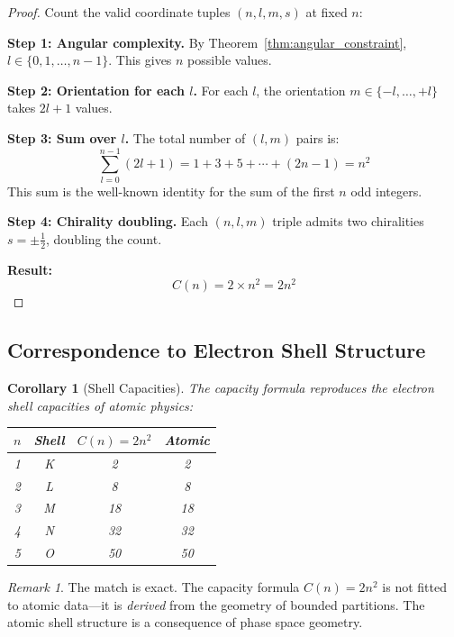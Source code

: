\documentclass[twocolumn,10pt,a4paper]{article}
\newtheorem{corollary}[theorem]{Corollary}
\theoremstyle{definition}
\theoremstyle{remark}
\newtheorem{remark}[theorem]{Remark}
\begin{document}
\begin{proof}
Count the valid coordinate tuples $(n, l, m, s)$ at fixed $n$:

\textbf{Step 1: Angular complexity.}
By Theorem~\ref{thm:angular_constraint}, $l \in \{0, 1, \ldots, n-1\}$. This gives $n$ possible values.

\textbf{Step 2: Orientation for each $l$.}
For each $l$, the orientation $m \in \{-l, \ldots, +l\}$ takes $2l + 1$ values.

\textbf{Step 3: Sum over $l$.}
The total number of $(l, m)$ pairs is:
\begin{equation}
    \sum_{l=0}^{n-1} (2l + 1) = 1 + 3 + 5 + \cdots + (2n-1) = n^2
\end{equation}
This sum is the well-known identity for the sum of the first $n$ odd integers.

\textbf{Step 4: Chirality doubling.}
Each $(n, l, m)$ triple admits two chiralities $s = \pm\frac{1}{2}$, doubling the count.

\textbf{Result:}
\begin{equation}
    C(n) = 2 \times n^2 = 2n^2
\end{equation}
\end{proof}

\subsection{Correspondence to Electron Shell Structure}

\begin{corollary}[Shell Capacities]
The capacity formula reproduces the electron shell capacities of atomic physics:
\begin{center}
\begin{tabular}{cccc}
\toprule
$n$ & Shell & $C(n) = 2n^2$ & Atomic \\
\midrule
1 & K & 2 & 2 \\
2 & L & 8 & 8 \\
3 & M & 18 & 18 \\
4 & N & 32 & 32 \\
5 & O & 50 & 50 \\
\bottomrule
\end{tabular}
\end{center}
\end{corollary}

\begin{remark}
The match is exact. The capacity formula $C(n) = 2n^2$ is not fitted to atomic data---it is \emph{derived} from the geometry of bounded partitions. The atomic shell structure is a consequence of phase space geometry.
\end{remark}
\end{document}
